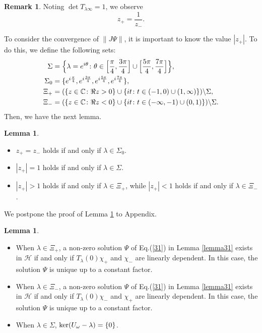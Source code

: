\documentclass[a4paper,12pt]{article}
\theoremstyle{plain}
\theoremstyle{definition}
\newtheorem{lemma}[thm]{Lemma}
\theoremstyle{definition}
\newtheorem{remark}{Remark}
\begin{document}
\begin{remark}
Noting $\det T_{\lambda \infty}=1$, we observe
\begin{equation}\label{eq4.2.1}
z_{+}=\frac{1}{z_{-}}.
\end{equation}
\end{remark}

To consider the convergence of $\|J\Psi\|$, it is important to know the value $|z_+|$. To do this, we define the following sets:
\begin{align*}
    \Sigma &= \Bigl\{\lambda =e^{i\theta} \colon \theta \in \Bigl[\frac{\pi}{4},\frac{3\pi}{4}\Bigr]\cup \Bigl[\frac{5\pi}{4},\frac{7\pi}{4}\Bigr] \Bigr\}, \\
    \Sigma_0 &=\{e^{i\frac{\pi}{4}}, e^{i\frac{3\pi}{4}}, e^{i\frac{5\pi}{4}}, e^{i\frac{7\pi}{4}} \}, \\
    \Xi_+ &=(\{z\in \mathbb{C} \colon \Re z>0 \} \cup \{it \colon t\in(-1,0)\cup (1,\infty)\} )\backslash \Sigma, \\
    \Xi_- &= (\{z\in \mathbb{C} \colon \Re z<0 \} \cup \{it \colon t\in(-\infty,-1)\cup (0,1)\}) \backslash \Sigma.
\end{align*}
Then, we have the next lemma. 
\begin{lemma}\label{lemma43}
\end{lemma}
\begin{itemize}
\item[(i)] $z_+=z_-$ holds if and only if $\lambda \in \Sigma_0$.

\item[(ii)] $|z_+|=1$ holds if and only if $\lambda \in \Sigma$.

\item[(iii)]$|z_+|>1$ holds if and only if $\lambda \in \Xi_{+}$, while $|z_+|<1$ holds if and only if $\lambda \in \Xi_{-}$.

\end{itemize}
We postpone the proof of Lemma \ref{lemma43} to Appendix.
\begin{lemma}\label{lemma33}
\begin{itemize}
\item[(i)]When $\lambda \in \Xi_{+}$, a non-zero solution $\Psi$ of Eq.(\ref{31}) in Lemma \ref{lemma31} exists in $\mathcal{H}$  if and only if $T_{\lambda}(0)\chi_{+}$ and $\chi_{-}$ are linearly dependent. In this case, the solution $\Psi$ is unique up to a constant factor.

\item[(ii)] When $\lambda \in \Xi_-$, a non-zero solution $\Psi$ of Eq.(\ref{31}) in Lemma \ref{lemma31} exists in $\mathcal{H}$ if and only if $T_{\lambda}(0)\chi_{-}$ and $\chi_{+}$ are linearly dependent. In this case, the solution $\Psi$ is unique up to a constant factor.
\item[(iii)]When $\lambda \in \Sigma$, ${\rm ker}(U_{\omega}-\lambda)=\{0\}$.
\end{itemize}
\end{lemma}
\end{document}
